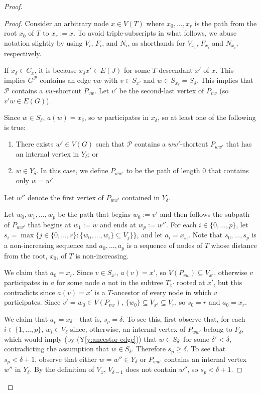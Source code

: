 \documentclass{patmorin}
\newcommand{\yref}[1]{(Y\ref{y:#1})}
\renewcommand{\ge}{\geqslant}
\begin{document}
\begin{proof}
\begin{proof}
  Consider an arbitrary node $x\in V(T)$ where $x_0,\ldots,x_r$ is the path from the root $x_0$ of $T$ to $x_r:=x$.  To avoid triple-subscripts in what follows, we abuse notation slightly by using $V_i$, $F_i$, and $N_i$,  as shorthands for $V_{x_i}$, $F_{x_i}$ and $N_{x_i}$, respectively.   

  If $x_\delta\in C_x$, it is because $x_\delta x'\in E(J)$ for some $T$-descendant $x'$ of $x$.  This implies $G^{\mathcal{P}}$ contains an edge $vw$ with $v\in S_{x'}$ and $w\in S_{x_\delta}=S_\delta$.  This implies that $\mathcal{P}$ contains a $vw$-shortcut $P_{vw}$.  Let $v'$ be the second-last vertex of $P_{vw}$ (so $v'w\in E(G)$).  
  
  Since $w\in S_{\delta}$, $a(w)=x_\delta$, so $w$ participates in $x_\delta$, so at least one of the following is true:
  \begin{enumerate}
    \item There exists $w'\in V(G)$ such that $\mathcal{P}$ contains a $ww'$-shortcut $P_{ww'}$ that has an internal vertex in $Y_{\delta}$; or
    \item $w\in Y_\delta$.  In this case, we define $P_{ww'}$ to be the path of length 0 that contains only $w=w'$. 
  \end{enumerate}
  Let $w''$ denote the first vertex of $P_{ww'}$ contained in $Y_{\delta}$.
  
  Let $w_0,w_1,\ldots,w_p$ be the path that begins $w_0:=v'$ and then follows the subpath of $P_{ww'}$ that begins at $w_1:=w$ and ends at $w_p:=w''$.  For each $i\in\{0,\ldots,p\}$, let $s_i=\max\{j\in\{0,\ldots,r\}: \{w_0,\ldots,w_i\}\subseteq V_{j}\}\}$, and let $a_i=x_{s_i}$.  Note that $s_0,\ldots,s_p$ is a non-increasing sequence and $a_0,\ldots,a_p$ is a sequence of nodes of $T$ whose distance from the root, $x_0$, of $T$ is non-increasing.

  We claim that $a_0=x_r$.  Since $v\in S_{x'}$, $a(v)=x'$, so $V(P_{vw})\subseteq V_{x'}$, otherwise $v$ participates in $a$ for some node $a$ not in the subtree $T_{x'}$ rooted at $x'$, but this contradicts  since $a(v)=x'$ is a $T$-ancestor of every node in which $v$ participates.  Since $v'=w_0\in V(P_{vw})$, $\{w_0\}\subseteq V_{x'}\subseteq V_{r}$, so $s_0=r$ and $a_0=x_r$.  
  
  We claim that $a_p=x_\delta$---that is, $s_p=\delta$. 
  To see this, first observe that, for each $i\in\{1,\ldots,p\}$, $w_i\in V_{\delta}$ since, otherwise, an internal vertex of $P_{ww'}$ belong to $F_\delta$, which would imply (by \yref{ancestor-edge}) that $w\in S_{\delta'}$ for some $\delta' < \delta$, contradicting the assumption that $w\in S_\delta$.  Therefore $s_p\ge\delta$.  To see that $s_p<\delta+1$,
  observe that either $w=w''\in Y_\delta$ or $P_{ww'}$ contains an internal vertex $w''$ in $Y_\delta$.  By the definition of $V_x$, $V_{\delta-1}$ does not contain $w''$, so $s_p<\delta+1$.
  

\end{proof}
\end{proof}
\end{document}
